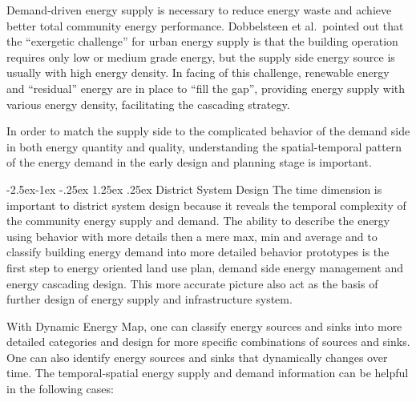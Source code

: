 \documentclass[hidelinks,12pt]{article}
\makeatletter
\renewcommand\paragraph{\@startsection{paragraph}{4}{\z@}%
            {-2.5ex\@plus -1ex \@minus -.25ex}%
            {1.25ex \@plus .25ex}%
            {\normalfont\normalsize\bfseries}}
\makeatother
\begin{document}
Demand-driven energy supply is necessary to reduce energy waste and
achieve better total community energy performance. Dobbelsteen et al.\
pointed out that the ``exergetic challenge'' for urban energy supply
is that the building operation requires only low or medium grade
energy, but the supply side energy source is usually with high energy
density. In facing of this challenge, renewable energy and
``residual'' energy are in place to ``fill the gap'', providing energy
supply with various energy density, facilitating the cascading
strategy\cite{Dobbelsteen2013}.

In order to match the supply side to the complicated behavior of the
demand side in both energy quantity and quality, understanding the
spatial-temporal pattern of the energy demand in the early design and
planning stage is important.

\paragraph{District System Design}
The time dimension is important to district system design because it
reveals the temporal complexity of the community energy supply and
demand. The ability to describe the energy using behavior with more
details then a mere max, min and average and to classify building
energy demand into more detailed behavior prototypes is the first step
to energy oriented land use plan, demand side energy management and
energy cascading design. This more accurate picture also act as the
basis of further design of energy supply and infrastructure system.

With Dynamic Energy Map, one can classify energy sources and sinks
into more detailed categories and design for more specific
combinations of sources and sinks. One can also identify energy
sources and sinks that dynamically changes over time. The
temporal-spatial energy supply and demand information can be helpful
in the following cases:
\end{document}
